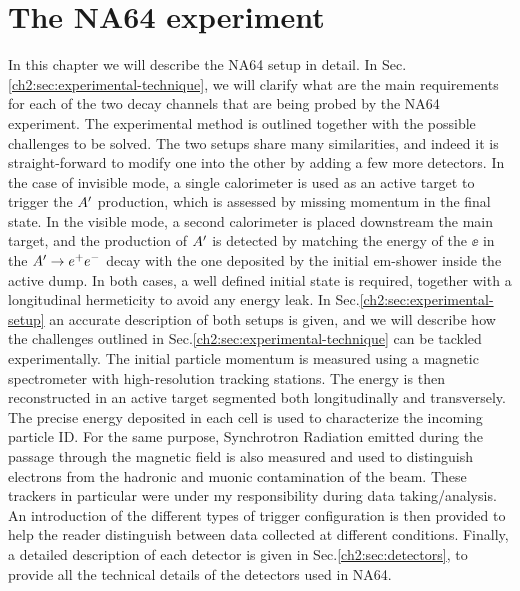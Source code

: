 
\newcommand{\pdirtwo}{chapters/plots/chapter2}

\chapter{The NA64 experiment} %

\label{chapter2} %


In this chapter we will describe the NA64 setup in detail. In Sec.\ref{ch2:sec:experimental-technique}, we will clarify what are the main requirements for each of the two decay channels that are being probed by the NA64 experiment. The experimental method is outlined together with the possible challenges to be solved. The two setups share many similarities, and indeed it is straight-forward to modify one into the other by adding a few more detectors. In the case of invisible mode, a single calorimeter is used as an active target to trigger the $A'$ production, which is assessed by missing momentum in the final state. In the visible mode, a second calorimeter is placed downstream the main target, and the production of $A'$ is detected by matching the energy of the $\ee$ in the $A' \to e^+e^-$ decay with the one deposited by the initial em-shower inside the active dump. In both cases, a well defined initial state is required, together with a longitudinal hermeticity to avoid any energy leak. In Sec.\ref{ch2:sec:experimental-setup} an accurate description of both setups is given, and we will describe how the challenges outlined in Sec.\ref{ch2:sec:experimental-technique} can be tackled experimentally. The initial particle momentum is measured using a magnetic spectrometer with high-resolution tracking stations. The energy is then reconstructed in an active target segmented both longitudinally and transversely. The precise energy deposited in each cell is used to characterize the incoming particle ID. For the same purpose, Synchrotron Radiation emitted during the passage through the magnetic field is also measured and used to distinguish electrons from the hadronic and muonic contamination of the beam. These trackers in particular were under my responsibility during data taking/analysis. An introduction of the different types of trigger configuration is then provided to help the reader distinguish between data collected at different conditions.
Finally, a detailed description of each detector is given in Sec.\ref{ch2:sec:detectors}, to provide all the technical details of the detectors used in NA64. 

